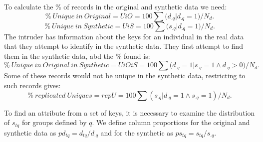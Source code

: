 \documentclass[12pt]{article}
\begin{document}
 To calculate the \% of records in the original and synthetic data we need:
  \begin{equation}
\%~Unique~in~Original = UiO = 100\sum{(d_{.q} |d_{.q} = 1})/N_d. 
  \end{equation}
  \begin{equation}
  \%~Unique~in~Synthetic = UiS = 100\sum{(s_{.q} |d_{.q} = 1})/N_d.
    \end{equation}
    The intruder has information about the keys for an individual in the real data that they attempt to identify in the synthetic data. They first attempt to find them in the synthetic data, abd  the \% found is:
      \begin{equation}
    \%~Unique~in~Original~in~Synthetic = UiOiS = 100 \sum{(d_{.q} = 1 |s_{.q} = 1 \land d_{.q} > 0})/N_d.
      \end{equation}
      Some of these records would not be unique in the synthetic data, restricting to such records gives:
        \begin{equation}
      \%~replicated~Uniques = repU = 100\sum{(s_{.q} |d_{.q} = 1 \land s_{.q} = 1)}/N_d.
      \end{equation}
      
      To find an attribute from a set of keys, it is necessary to examine the distribution of $s_{tq}$ for groups defined by $q$. We define column proportions for the original and synthetic data as $pd_{tq} = d_{tq}/d_{.q}$ and for the synthetic as $ps_{tq} = s_{tq}/s_{.q}$.
     
\end{document}
